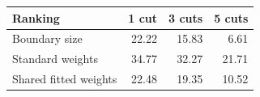 \begin{tabular}{@{}lrrr@{}}
\toprule
Ranking & 1 cut & 3 cuts & 5 cuts \\
\midrule
Boundary size & 22.22 & 15.83 & 6.61 \\
Standard weights & 34.77 & 32.27 & 21.71 \\
Shared fitted weights & 22.48 & 19.35 & 10.52 \\
\bottomrule
\end{tabular}
